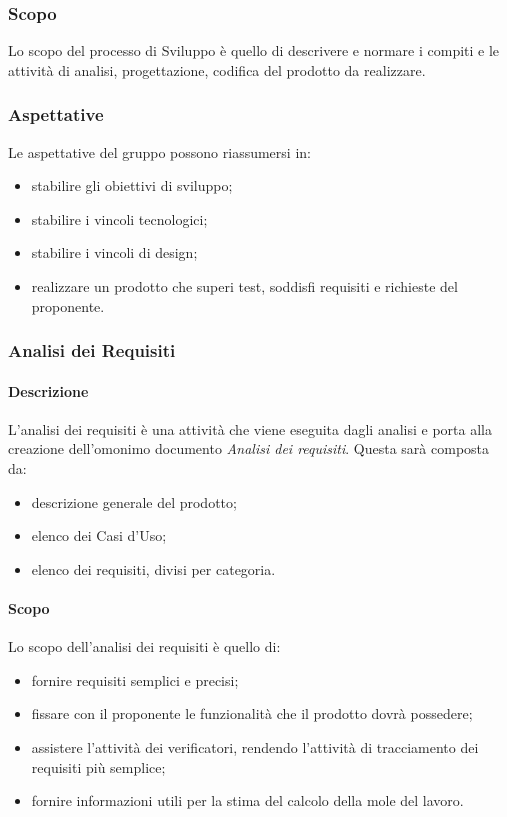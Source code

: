   \subsubsection{Scopo}
	Lo scopo del processo di Sviluppo è quello di descrivere e normare i compiti e le attività di analisi, progettazione, codifica del prodotto da realizzare.
		
  \subsubsection{Aspettative}
  Le aspettative del gruppo possono riassumersi in:
	\begin{itemize}
		\item stabilire gli obiettivi di sviluppo;
		\item stabilire i vincoli tecnologici;
		\item stabilire i vincoli di design;
		\item realizzare un prodotto che superi test, soddisfi requisiti e richieste del proponente.
	\end{itemize}
	
	\subsubsection{Analisi dei Requisiti}
    \paragraph{Descrizione} \hfill \break
    L'analisi dei requisiti è una attività che viene eseguita dagli analisi e porta alla creazione 
    dell'omonimo documento \textit{Analisi dei requisiti}.
    Questa sarà composta da:
    \begin{itemize}
      \item descrizione generale del prodotto;
      \item elenco dei Casi d'Uso;
      \item elenco dei requisiti, divisi per categoria.
    \end{itemize}
    
    \paragraph{Scopo} \hfill \break
    Lo scopo dell'analisi dei requisiti è quello di:
    \begin{itemize}
      \item fornire requisiti semplici e precisi;
      \item fissare con il proponente le funzionalità che il prodotto dovrà possedere;
      \item assistere l'attività dei verificatori, rendendo l'attività di tracciamento dei requisiti più semplice;
      \item fornire informazioni utili per la stima del calcolo della mole del lavoro.
    \end{itemize}
    
